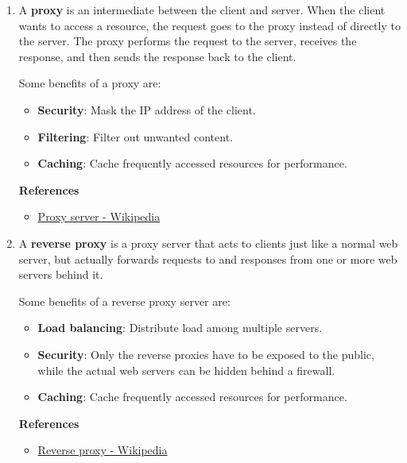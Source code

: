 \documentclass[12pt, a4paper]{article}
\begin{document}
\begin{enumerate}
    \item A \textbf{proxy} is an intermediate between the client and server. When the client
    wants to access a resource, the request goes to the proxy instead of directly to
    the server. The proxy performs the request to the server, receives the response,
    and then sends the response back to the client.

    Some benefits of a proxy are:
    \begin{itemize}
      \item \textbf{Security}: Mask the IP address of the client.
      \item \textbf{Filtering}: Filter out unwanted content.
      \item \textbf{Caching}: Cache frequently accessed resources for performance.
    \end{itemize}

    \textbf{References}
    \begin{itemize}
      \item \href{https://en.wikipedia.org/wiki/Proxy_server}{Proxy server - Wikipedia}
    \end{itemize}

    \item A \textbf{reverse proxy} is a proxy server that acts to clients just like a
    normal web server, but actually forwards requests to and responses from one or more web
    servers behind it.

    Some benefits of a reverse proxy server are:
    \begin{itemize}
      \item \textbf{Load balancing}: Distribute load among multiple servers.
      \item \textbf{Security}: Only the reverse proxies have to be exposed to the public,
      while the actual web servers can be hidden behind a firewall.
      \item \textbf{Caching}: Cache frequently accessed resources for performance.
    \end{itemize}

    \textbf{References}
    \begin{itemize}
      \item \href{https://en.wikipedia.org/wiki/Reverse_proxy}{Reverse proxy - Wikipedia}
    \end{itemize}
  \end{enumerate}

  \pagebreak
\end{document}
